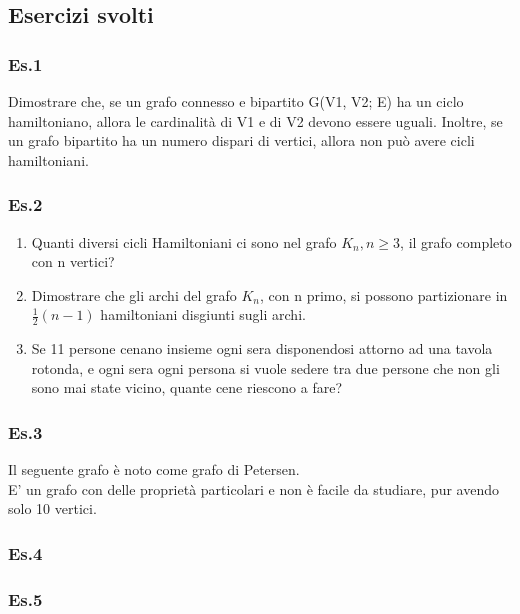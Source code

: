 \subsection{Esercizi svolti}
\subsubsection{Es.1}
Dimostrare che, se un grafo connesso e bipartito G(V1, V2; E) ha un ciclo hamiltoniano, allora
le cardinalità di V1 e di V2 devono essere uguali.
Inoltre, se un grafo bipartito ha un numero dispari di vertici, allora non può avere cicli
hamiltoniani.

\subsubsection{Es.2}
\begin{enumerate}
    \item Quanti diversi cicli Hamiltoniani ci sono nel grafo \(K_n, n \geq 3\), il grafo completo con n vertici?
    \item Dimostrare che gli archi del grafo \(K_n\), con n primo, si possono partizionare in \(\frac{1}{2}(n-1)\) hamiltoniani disgiunti sugli archi.
    \item Se 11 persone cenano insieme ogni sera disponendosi attorno ad una tavola rotonda, e ogni
    sera ogni persona si vuole sedere tra due persone che non gli sono mai state vicino, quante cene
    riescono a fare?
\end{enumerate}

\subsubsection{Es.3} Il seguente grafo è noto come grafo di Petersen.\\
E' un grafo con delle proprietà particolari e non è facile da studiare, pur avendo solo 10 vertici.

\subsubsection{Es.4}

\subsubsection{Es.5}



\newpage
